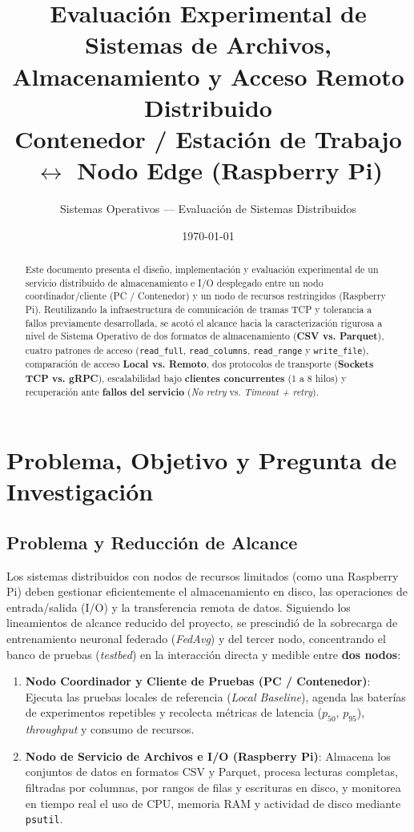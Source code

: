 \documentclass[11pt,a4paper]{article}
\title{\textbf{Evaluación Experimental de Sistemas de Archivos, Almacenamiento y Acceso Remoto Distribuido}\\
\large Contenedor / Estación de Trabajo $\leftrightarrow$ Nodo Edge (Raspberry Pi)}
\author{Sistemas Operativos — Evaluación de Sistemas Distribuidos}
\date{\today}
\begin{document}
\maketitle

\begin{abstract}
Este documento presenta el diseño, implementación y evaluación experimental de un servicio distribuido de almacenamiento e I/O desplegado entre un nodo coordinador/cliente (PC / Contenedor) y un nodo de recursos restringidos (Raspberry Pi). Reutilizando la infraestructura de comunicación de tramas TCP y tolerancia a fallos previamente desarrollada, se acotó el alcance hacia la caracterización rigurosa a nivel de Sistema Operativo de dos formatos de almacenamiento (\textbf{CSV vs. Parquet}), cuatro patrones de acceso (\texttt{read\_full}, \texttt{read\_columns}, \texttt{read\_range} y \texttt{write\_file}), comparación de acceso \textbf{Local vs. Remoto}, dos protocolos de transporte (\textbf{Sockets TCP vs. gRPC}), escalabilidad bajo \textbf{clientes concurrentes} (1 a 8 hilos) y recuperación ante \textbf{fallos del servicio} (\textit{No retry} vs. \textit{Timeout + retry}).
\end{abstract}

\section{Problema, Objetivo y Pregunta de Investigación}

\subsection{Problema y Reducción de Alcance}
Los sistemas distribuidos con nodos de recursos limitados (como una Raspberry Pi) deben gestionar eficientemente el almacenamiento en disco, las operaciones de entrada/salida (I/O) y la transferencia remota de datos. Siguiendo los lineamientos de alcance reducido del proyecto, se prescindió de la sobrecarga de entrenamiento neuronal federado (\textit{FedAvg}) y del tercer nodo, concentrando el banco de pruebas (\textit{testbed}) en la interacción directa y medible entre \textbf{dos nodos}:
\begin{enumerate}
    \item \textbf{Nodo Coordinador y Cliente de Pruebas (PC / Contenedor)}: Ejecuta las pruebas locales de referencia (\textit{Local Baseline}), agenda las baterías de experimentos repetibles y recolecta métricas de latencia ($p_{50}$, $p_{95}$), \textit{throughput} y consumo de recursos.
    \item \textbf{Nodo de Servicio de Archivos e I/O (Raspberry Pi)}: Almacena los conjuntos de datos en formatos CSV y Parquet, procesa lecturas completas, filtradas por columnas, por rangos de filas y escrituras en disco, y monitorea en tiempo real el uso de CPU, memoria RAM y actividad de disco mediante \texttt{psutil}.
\end{enumerate}
\end{document}
